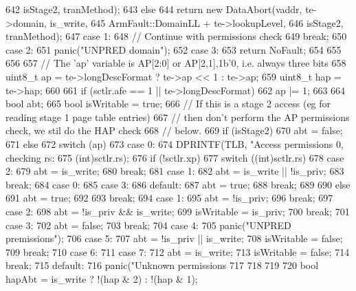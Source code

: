 \begin{DoxyCode}
{{{642                                          isStage2, tranMethod);
643             else
644                 return new DataAbort(vaddr, te->domain, is_write,
645                                      ArmFault::DomainLL + te->lookupLevel,
646                                      isStage2, tranMethod);
647           case 1:
648             // Continue with permissions check
649             break;
650           case 2:
651             panic("UNPRED domain\n");
652           case 3:
653             return NoFault;
654         }
655     }
656 
657     // The 'ap' variable is AP[2:0] or {AP[2,1],1b'0}, i.e. always three bits
658     uint8_t ap  = te->longDescFormat ? te->ap << 1 : te->ap;
659     uint8_t hap = te->hap;
660 
661     if (sctlr.afe == 1 || te->longDescFormat)
662         ap |= 1;
663 
664     bool abt;
665     bool isWritable = true;
666     // If this is a stage 2 access (eg for reading stage 1 page table entries)
667     // then don't perform the AP permissions check, we stil do the HAP check
668     // below.
669     if (isStage2) {
670         abt = false;
671     } else {
672         switch (ap) {
673           case 0:
674             DPRINTF(TLB, "Access permissions 0, checking rs:%
675                     (int)sctlr.rs);
676             if (!sctlr.xp) {
677                 switch ((int)sctlr.rs) {
678                   case 2:
679                     abt = is_write;
680                     break;
681                   case 1:
682                     abt = is_write || !is_priv;
683                     break;
684                   case 0:
685                   case 3:
686                   default:
687                     abt = true;
688                     break;
689                 }
690             } else {
691                 abt = true;
692             }
693             break;
694           case 1:
695             abt = !is_priv;
696             break;
697           case 2:
698             abt = !is_priv && is_write;
699             isWritable = is_priv;
700             break;
701           case 3:
702             abt = false;
703             break;
704           case 4:
705             panic("UNPRED premissions\n");
706           case 5:
707             abt = !is_priv || is_write;
708             isWritable = false;
709             break;
710           case 6:
711           case 7:
712             abt        = is_write;
713             isWritable = false;
714             break;
715           default:
716             panic("Unknown permissions %
717         }
718     }
719 
720     bool hapAbt = is_write ? !(hap & 2) : !(hap & 1);
}
\end{DoxyCode}
